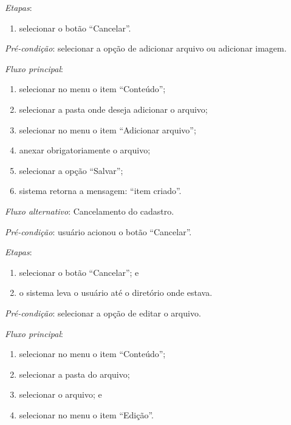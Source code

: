 \noindent \textit{Etapas}:

\begin{enumerate}
    \item selecionar o botão ``Cancelar''.
\end{enumerate}



\vspace{0.7cm}

\noindent \textit{Pré-condição}: selecionar a opção de adicionar arquivo ou adicionar imagem.

\noindent \textit{Fluxo principal}:

\begin{enumerate}
    \item selecionar no menu o item ``Conteúdo'';
    \item selecionar a pasta onde deseja adicionar o arquivo;
    \item selecionar no menu o item ``Adicionar arquivo'';
    \item anexar obrigatoriamente o arquivo;
    \item selecionar a opção ``Salvar'';
    \item sistema retorna a mensagem: ``item criado''.
\end{enumerate}

\noindent \textit{Fluxo alternativo}: Cancelamento do cadastro.

\noindent \textit{Pré-condição}:  usuário acionou o botão ``Cancelar''.

\noindent \textit{Etapas}:

\begin{enumerate}
    \item selecionar o botão ``Cancelar''; e
    \item o sistema leva o usuário até o diretório onde estava.
\end{enumerate}



\vspace{0.7cm}

\noindent \textit{Pré-condição}: selecionar a opção de editar o arquivo.

\noindent \textit{Fluxo principal}:

\begin{enumerate}
    \item selecionar no menu o item ``Conteúdo'';
    \item selecionar a pasta do arquivo;
    \item selecionar o arquivo; e
    \item selecionar no menu o item ``Edição''.
\end{enumerate}

